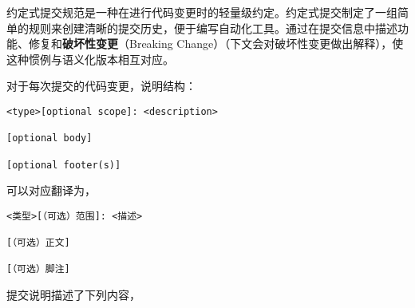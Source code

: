 
\begin{issues}
\issueDraft
\issueTODO
\end{issues}

约定式提交规范是一种在进行代码变更时的轻量级约定。约定式提交制定了一组简单的规则来创建清晰的提交历史，便于编写自动化工具。通过在提交信息中描述功能、修复和\textbf{破坏性变更}（Breaking Change）（下文会对破坏性变更做出解释），使这种惯例与语义化版本相互对应。

对于每次提交的代码变更，说明结构：
\begin{lstlisting}[language=none]
<type>[optional scope]: <description>

[optional body]

[optional footer(s)]
\end{lstlisting}
可以对应翻译为，
\begin{lstlisting}[language=none]
<类型>[（可选）范围]: <描述>

[（可选）正文]

[（可选）脚注]
\end{lstlisting}
提交说明描述了下列内容，